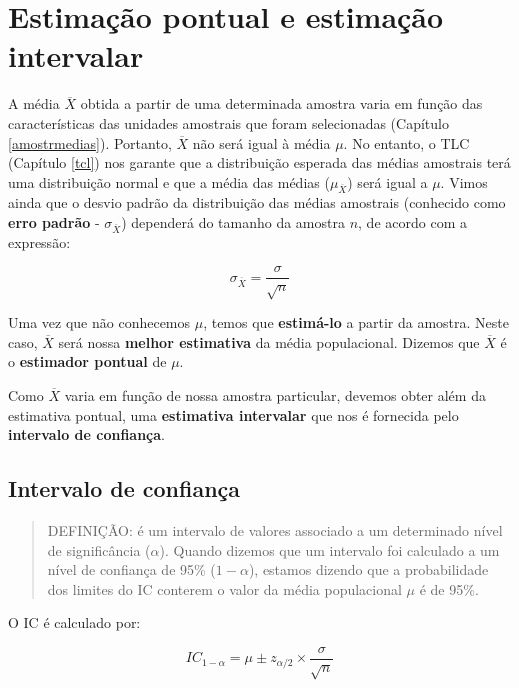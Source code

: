 \documentclass[
]{book}
\begin{document}
\hypertarget{estimauxe7uxe3o-pontual-e-estimauxe7uxe3o-intervalar}{%
\section{Estimação pontual e estimação intervalar}\label{estimauxe7uxe3o-pontual-e-estimauxe7uxe3o-intervalar}}

A média \(\overline{X}\) obtida a partir de uma determinada amostra varia em função das características das unidades amostrais que foram selecionadas (Capítulo \ref{amostrmedias}). Portanto, \(\overline{X}\) não será igual à média \(\mu\). No entanto, o TLC (Capítulo \ref{tcl}) nos garante que a distribuição esperada das médias amostrais terá uma distribuição normal e que a média das médias (\(\mu_{\overline{X}}\)) será igual a \(\mu\). Vimos ainda que o desvio padrão da distribuição das médias amostrais (conhecido como \textbf{erro padrão} - \(\sigma_{\overline{X}}\)) dependerá do tamanho da amostra \(n\), de acordo com a expressão:

\[\sigma_{\overline{X}} = \frac{\sigma}{\sqrt{n}}\]

Uma vez que não conhecemos \(\mu\), temos que \textbf{estimá-lo} a partir da amostra. Neste caso, \(\overline{X}\) será nossa \textbf{melhor estimativa} da média populacional. Dizemos que \(\overline{X}\) é o \textbf{estimador pontual} de \(\mu\).

Como \(\overline{X}\) varia em função de nossa amostra particular, devemos obter além da estimativa pontual, uma \textbf{estimativa intervalar} que nos é fornecida pelo \textbf{intervalo de confiança}.

\hypertarget{intervalo-de-confianuxe7a}{%
\subsection{Intervalo de confiança}\label{intervalo-de-confianuxe7a}}

\begin{quote}
DEFINIÇÃO: é um intervalo de valores associado a um determinado nível de significância (\(\alpha\)). Quando dizemos que um intervalo foi calculado a um nível de confiança de 95\% (\(1 - \alpha\)), estamos dizendo que a probabilidade dos limites do IC conterem o valor da média populacional \(\mu\) é de 95\%.
\end{quote}

O IC é calculado por:

\[IC_{1-\alpha} = \mu \pm z_{\alpha/2} \times \frac{\sigma}{\sqrt{n}}\]
\end{document}
